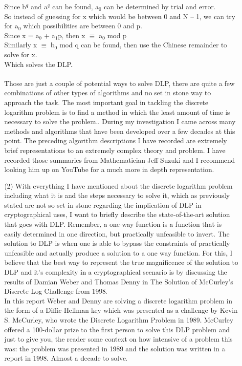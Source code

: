 \documentclass{article}
\begin{document}
\begin{itemize}
    Since b$^q$ and a$^q$ can be found, a$_0$ can be determined by trial and error.\\
    So instead of guessing for x which would be between 0 and N – 1, we can try for a$_0$ which possibilities are between 0 and p.\\
    Since x = a$_0$ + a$_1$p, then x $\equiv$ a$_0$ mod p \\
    Similarly x $\equiv$ b$_0$ mod q can be found, then use the Chinese remainder to solve for x. \\
    Which solves the DLP. \\
    \\
    Those are just a couple of potential ways to solve DLP, there are quite a few combinations of other types of algorithms and no set in stone way to approach the task. The most important goal in tackling the discrete logarithm problem is to find a method in which the least amount of time is necessary to solve the problem.. During my investigation I came across many methods and algorithms that have been developed over a few decades at this point. The preceding algorithm descriptions I have recorded are extremely brief representations to an extremely complex theory and problem. I have recorded those summaries from  Mathematician Jeff Suzuki and I recommend looking him up on YouTube for a much more in depth representation. \\
    

   
    \item[(2)] With everything I have mentioned about the discrete logarithm problem including what it is and the steps necessary to solve it, which as previously stated are not so set in stone regarding the implication of DLP in cryptographical uses, I want to briefly describe the state-of-the-art solution that goes with DLP. Remember, a one-way function is a function that is easily determined in one direction, but practically unfeasible to invert. The solution to DLP is when one is able to bypass the constraints of practically unfeasible and actually produce a solution to a one way function. For this, I believe that the best way to represent the true magnificence of the solution to DLP and it’s complexity in a cryptographical scenario is by discussing the results of Damian Weber and Thomas Denny in The Solution of McCurley's Discrete Log Challenge from 1998.\\
    
    In this report Weber and Denny are solving a discrete logarithm problem in the form of a Diffie-Hellman key which was presented as a challenge by Kevin S. McCurley, who wrote the Discrete Logarithm Problem in 1989. McCurley offered a 100-dollar prize to the first person to solve this DLP problem and just to give you, the reader some context on how intensive of a problem this was: the problem was presented in 1989 and the solution was written in a report in 1998. Almost a decade to solve. \\ 
    

\end{itemize}
\end{document}
